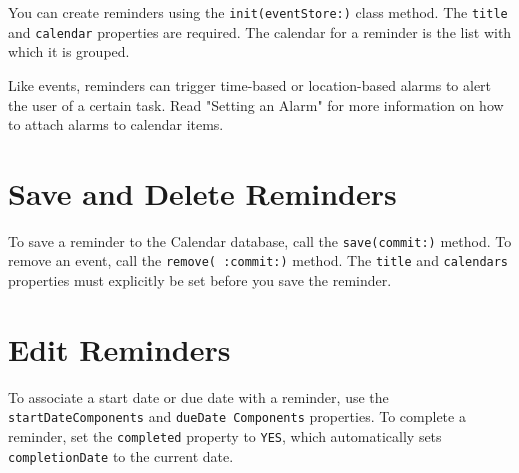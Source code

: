 \documentclass{article}
\begin{document}
\noindent{}

You can create reminders using the \texttt{init(eventStore:)} class method. The \texttt{title} and \texttt{calendar} properties
are required. The calendar for a reminder is the list with which it is grouped.

Like events, reminders can trigger time-based or location-based alarms to alert the user of a certain task. Read
"Setting an Alarm" for more information on how to attach alarms to calendar items.

\section*{Save and Delete Reminders}
To save a reminder to the Calendar database, call the \texttt{save(commit:)} method. To remove an event, call the
\texttt{remove( :commit:)} method. The \texttt{title} and \texttt{calendars} properties must explicitly be set before you save
the reminder.

\noindent{}

\section*{Edit Reminders}
To associate a start date or due date with a reminder, use the \texttt{startDateComponents} and \texttt{dueDate
Components} properties. To complete a reminder, set the \texttt{completed} property to \texttt{YES}, which automatically sets
\texttt{completionDate} to the current date.

\noindent{}
\end{document}
